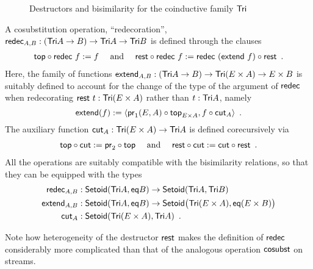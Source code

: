 \documentclass[envcountsame]{llncs}
\begin{document}
\begin{example}
\begin{figure}[bt]
  \caption{Destructors and bisimilarity for the coinductive family $\Tri$} \label{fig:tri_destructors}
\end{figure}
% 
% 
  A cosubstitution operation, \enquote{redecoration},
    $ \redec_{A,B} : (\Tri A \to B) \to \Tri A \to \Tri B$
  is defined  through the clauses
    \begin{align} \comp{\redec~f}{\head} := f \quad\text{ and } \quad
                  \comp{\redec~f}{\tail} := \comp{\tail}{\redec~(\extend~f)} \enspace . \label{eq:rest_redec}
    \end{align}
Here, the family of functions 
     $\extend_{A,B} : (\Tri A \to B) \to \Tri (E \times A) \to E\times B $
  is suitably defined to account for the change of the type of the argument of $\redec$ when redecorating $\tail~t : \Tri(E\times A)$
  rather than $t : \Tri A$, namely
  \[ \extend(f) := \langle \comp{\head_{E\times A}}{\pr_1(E,A)} , \comp{\cut_A}{f} \rangle \enspace . \]
  The auxiliary function $\cut_A : \Tri(E\times A) \to \Tri A$ is defined corecursively via
      \begin{align*} \comp{\cut}{\head} := \comp{\head}{\pr_2} \quad\text{ and } \quad
                     \comp{\cut}{\tail} := \comp{\tail}{\cut} \enspace . 
      \end{align*}
%       
All the operations are suitably compatible with the bisimilarity relations, so that they can be equipped with the types
  \begin{align*}
    \redec_{A,B} &: \Setoid(\Tri A,\eq B) \to \Setoid(\Tri A,\Tri B ) \\
    \extend_{A,B} &: \Setoid(\Tri A,\eq B) \to \Setoid\bigr(\Tri (E \times A),\eq(E\times B)\bigr) \\
    \cut_A &:  \Setoid(\Tri(E\times A) , \Tri A) \enspace .
  \end{align*}
\end{example}

\begin{Long}
Note how heterogeneity of the destructor $\tail$ makes the definition of $\redec$ considerably more complicated than that of
the analogous operation $\sredec$ on streams.
\end{Long}
\end{document}

